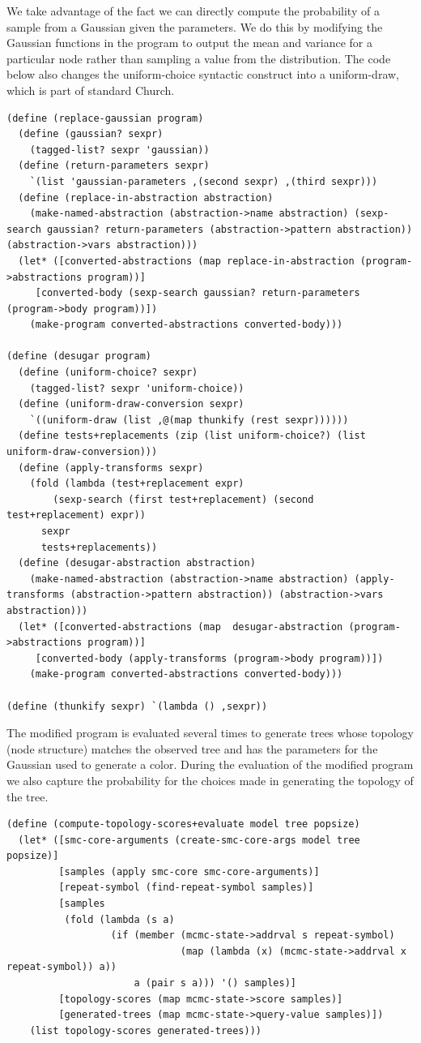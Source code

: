 \documentclass[a4paper,10pt]{article}
\begin{document}
We take advantage of the fact we can directly compute the probability of a sample from a Gaussian given the parameters.  We do this by modifying the Gaussian functions in the program to output the mean and variance for a particular node rather than sampling a value from the distribution.  The code below also changes the uniform-choice syntactic construct into a uniform-draw, which is part of standard Church.
\begin{lstlisting}[frame=trBL]
(define (replace-gaussian program)
  (define (gaussian? sexpr)
    (tagged-list? sexpr 'gaussian))
  (define (return-parameters sexpr)
    `(list 'gaussian-parameters ,(second sexpr) ,(third sexpr)))
  (define (replace-in-abstraction abstraction)
    (make-named-abstraction (abstraction->name abstraction) (sexp-search gaussian? return-parameters (abstraction->pattern abstraction)) (abstraction->vars abstraction)))
  (let* ([converted-abstractions (map replace-in-abstraction (program->abstractions program))]
	 [converted-body (sexp-search gaussian? return-parameters (program->body program))])
    (make-program converted-abstractions converted-body)))

(define (desugar program)
  (define (uniform-choice? sexpr)
    (tagged-list? sexpr 'uniform-choice))
  (define (uniform-draw-conversion sexpr)
    `((uniform-draw (list ,@(map thunkify (rest sexpr))))))
  (define tests+replacements (zip (list uniform-choice?) (list uniform-draw-conversion)))
  (define (apply-transforms sexpr)
    (fold (lambda (test+replacement expr)
	    (sexp-search (first test+replacement) (second test+replacement) expr))
	  sexpr
	  tests+replacements))
  (define (desugar-abstraction abstraction)
    (make-named-abstraction (abstraction->name abstraction) (apply-transforms (abstraction->pattern abstraction)) (abstraction->vars abstraction)))
  (let* ([converted-abstractions (map  desugar-abstraction (program->abstractions program))]
	 [converted-body (apply-transforms (program->body program))])
    (make-program converted-abstractions converted-body)))

(define (thunkify sexpr) `(lambda () ,sexpr))
\end{lstlisting}
The modified program is evaluated several times to generate trees whose topology (node structure) matches the observed tree and has the parameters for the Gaussian used to generate a color.  During the evaluation of the modified program we also capture the probability for the choices made in generating the topology of the tree.  
\begin{lstlisting}[frame=trBL]
(define (compute-topology-scores+evaluate model tree popsize)
  (let* ([smc-core-arguments (create-smc-core-args model tree popsize)]
         [samples (apply smc-core smc-core-arguments)]
         [repeat-symbol (find-repeat-symbol samples)]
         [samples
          (fold (lambda (s a)
                  (if (member (mcmc-state->addrval s repeat-symbol)
                              (map (lambda (x) (mcmc-state->addrval x repeat-symbol)) a))
                      a (pair s a))) '() samples)]
         [topology-scores (map mcmc-state->score samples)]
         [generated-trees (map mcmc-state->query-value samples)])
    (list topology-scores generated-trees)))
\end{lstlisting}
\end{document}
